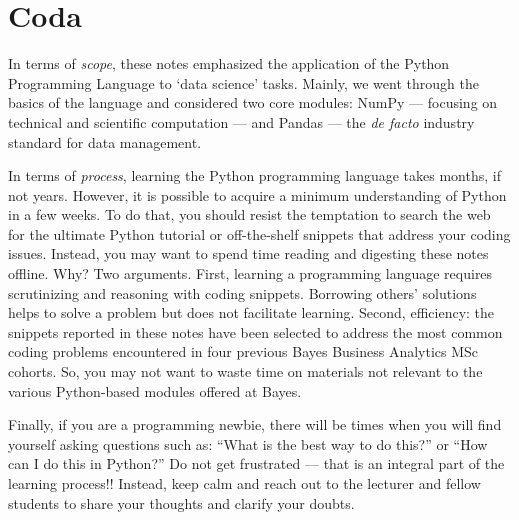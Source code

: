 \documentclass[a4paper,11pt]{book}
\begin{document}
\clearpage

\theendnotes
\clearpage

\chapter{Coda}

\raggedright In terms of \textit{scope}, these notes emphasized the application of the Python Programming Language to `data science' tasks. Mainly, we went through the basics of the language and considered two core modules: NumPy --- focusing on technical and scientific computation --- and Pandas --- the \textit{de facto} industry standard for data management.

\quad In terms of \textit{process}, learning the Python programming language takes months, if not years. However, it is possible to acquire a minimum understanding of Python in a few weeks. To do that, you should resist the temptation to search the web for the ultimate Python tutorial or off-the-shelf snippets that address your coding issues. Instead, you may want to spend time reading and digesting these notes offline. Why? Two arguments. First, learning a programming language requires scrutinizing and reasoning with coding snippets. Borrowing others' solutions helps to solve a problem but does not facilitate learning. Second, efficiency: the snippets reported in these notes have been selected to address the most common coding problems encountered in four previous Bayes Business Analytics MSc cohorts. So, you may not want to waste time on materials not relevant to the various Python-based modules offered at Bayes.

\quad Finally, if you are a programming newbie, there will be times when you will find yourself asking questions such as: ``What is the best way to do this?'' or ``How can I do this in Python?'' Do not get frustrated --- that is an integral part of the learning process!! Instead, keep calm and reach out to the lecturer and fellow students to share your thoughts and clarify your doubts.
\clearpage
\end{document}
